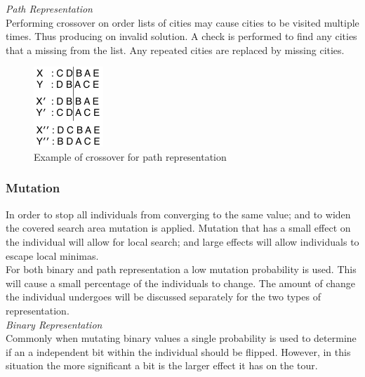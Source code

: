 \documentclass[10pt,a4paper,openbib]{article}
\begin{document}
\begin{multicols}{2}
\noindent \textit{Path Representation} \\

\noindent Performing crossover on order lists of cities may cause cities to be visited multiple times. Thus producing on invalid solution. A check is performed to find any cities that a missing from the list. Any repeated cities are replaced by missing cities. \\

\begin{figure}[H]
\begin{center}
\includegraphics[scale=0.6]{images/orderCrossover.png} 
\caption{Example of crossover for path representation}
\label{fig:orderCrossover}
\end{center}
\end{figure}

\subsubsection{Mutation}\label{mutationExplained}

In order to stop all individuals from converging to the same value; and to widen the covered search area mutation is applied. Mutation that has a small effect on the individual will allow for local search; and large effects will allow individuals to escape local minimas. \\

\noindent For both binary and path representation a low mutation probability is used. This will cause a small percentage of the individuals to change. The amount of change the individual undergoes will be discussed separately for the two types of representation. \\

\noindent \textit{Binary Representation} \\

\noindent Commonly when mutating binary values a single probability is used to determine if an a independent bit within the individual should be flipped. However, in this situation the more significant a bit is the larger effect it has on the tour. \\



\end{multicols}
\end{document}
